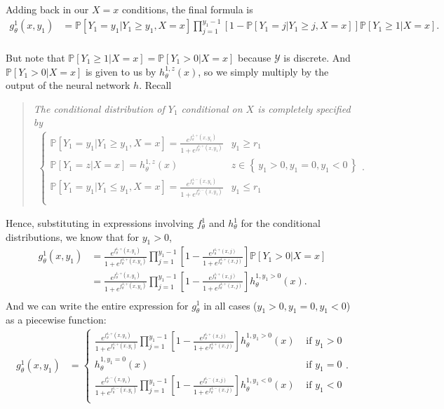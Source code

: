 \documentclass[12pt, reqno]{amsart}
\theoremstyle{definition}
\theoremstyle{definition}
\theoremstyle{plain}
\theoremstyle{definition}
\theoremstyle{remark}
\newcommand{\bee}{\begin{equation}\begin{aligned}}
\newcommand{\eee}{\end{aligned}\end{equation}}
\newcommand{\fracc}{\frac}				%
\newcommand{\lbrac}{\left[}				%
\newcommand{\rbrac}{\right]}
\renewcommand{\leq}{\leqslant}			%
\renewcommand{\geq}{\geqslant}			%
\renewcommand{\'}{\hspace{0.5mm}'}			%
\renewcommand{\Set}[1]{\left\{\,#1\,\right\}}	%
\begin{document}
Adding back in our $X = x$ conditions, the final formula is 
\bee
g_\theta^1(x,y_1)
&=
		\mathbb{P}[Y_1 = y_1|Y_1 \geq y_1, X = x]
		\prod_{j = 1}^{y_1 - 1}
		\lbrac 
			1 - \mathbb{P}[Y_1 = j|Y_1 \geq j, X = x]
		\rbrac 
		\mathbb{P}[Y_1 \geq 1|X = x]. 
		\\
\eee

But note that $\mathbb{P}[Y_1 \geq 1|X = x] = \mathbb{P}[Y_1 > 0|X = x]$ because $\mathcal{Y}$ is discrete. And $\mathbb{P}[Y_1 > 0|X = x]$ is given to us by $h_\theta^{1,z}(x)$, so we simply multiply by the output of the neural network $h$. Recall
\begin{quote}
\textit{The conditional distribution of $Y_1$ conditional on $X$ is completely specified by}
\bee\label{y1conddist}
	\begin{cases}
		\mathbb{P}[Y_1 = y_1|Y_1 \geq y_1, X = x] 
		= \fracc{
			e^{f_\theta^{1,+}(x,y_1)}
		}{
			1 + e^{f_\theta^{1,+}(x,y_1)}
		} 
		& y_1 \geq r_1 \\
		\mathbb{P}[Y_1 = z|X = x] = h_\theta^{1,z}(x) 
		& z \in \Set{y_1 > 0, y_1 = 0, y_1 < 0} \\
		\mathbb{P}[Y_1 = y_1|Y_1 \leq y_1, X = x] 
		= \fracc{
			e^{f_\theta^{1,-}(x,y_1)}
		}{
			1 + e^{f_\theta^{1,-}(x,y_1)}
		} 
		& y_1 \leq r_1 \\
	\end{cases}.
\eee
\end{quote}
Hence, substituting in expressions involving $f_\theta^1$ and $h_\theta^1$ for the conditional distributions, we know that for $y_1 > 0$, 
\bee
	g_\theta^1(x,y_1)
	&=
		\fracc{
			e^{f_\theta^{1,+}(x,y_1)}
		}{
			1 + e^{f_\theta^{1,+}(x,y_1)}
		}
		\prod_{j = 1}^{y_1 - 1}
		\lbrac 
			1 - 
			\fracc{
				e^{f_\theta^{1,+}(x,j)}
			}{
				1 + e^{f_\theta^{1,+}(x,j)}
			}
		\rbrac
		\mathbb{P}[Y_1 > 0|X = x]
		\\
	&=
		\fracc{
			e^{f_\theta^{1,+}(x,y_1)}
		}{
			1 + e^{f_\theta^{1,+}(x,y_1)}
		}
		\prod_{j = 1}^{y_1 - 1}
		\lbrac 
			1 - 
			\fracc{
				e^{f_\theta^{1,+}(x,j)}
			}{
				1 + e^{f_\theta^{1,+}(x,j)}
			}
		\rbrac
		h_\theta^{1, y_1 > 0}(x). 
		\\
\eee
And we can write the entire expression for $g_\theta^1$ in all cases ($y_1 > 0, y_1 = 0, y_1 < 0$)
as a piecewise function:
\bee
	g_\theta^1(x,y_1)
	&=
	\begin{cases}
		\displaystyle\fracc{
			e^{f_\theta^{1,+}(x,y_1)}
		}{
			1 + e^{f_\theta^{1,+}(x,y_1)}
		}
		\displaystyle\prod_{j = 1}^{y_1 - 1}
		\lbrac 
			1 - 
			\fracc{
				e^{f_\theta^{1,+}(x,j)}
			}{
				1 + e^{f_\theta^{1,+}(x,j)}
			}
		\rbrac
		h_\theta^{1, y_1 > 0}(x)
		& \text{ if } y_1 > 0
		\\
		\displaystyle h_\theta^{1, y_1 = 0}(x)
		& \text{ if } y_1 = 0
		\\
		\displaystyle\fracc{
			e^{f_\theta^{1,-}(x,y_1)}
		}{
			1 + e^{f_\theta^{1,-}(x,y_1)}
		}
		\displaystyle\prod_{j = 1}^{y_1 - 1}
		\lbrac 
			1 - 
			\fracc{
				e^{f_\theta^{1,-}(x,j)}
			}{
				1 + e^{f_\theta^{1,-}(x,j)}
			}
		\rbrac
		h_\theta^{1, y_1 < 0}(x)
		& \text{ if } y_1 < 0
		\\
	\end{cases}.
\eee
\end{document}
